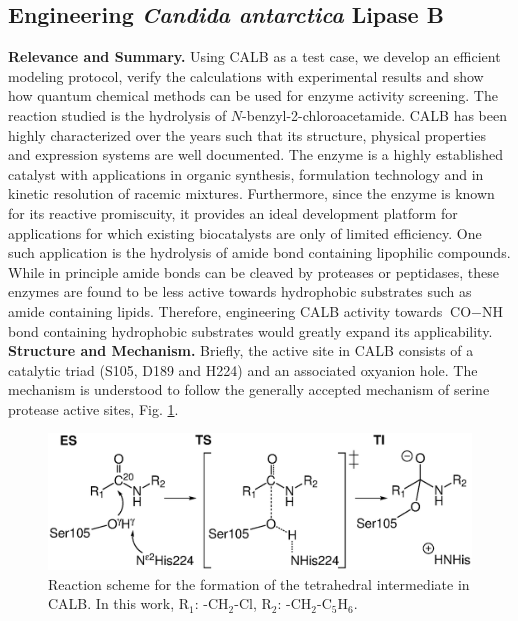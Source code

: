 \subsection{Engineering {\textit{Candida antarctica} Lipase B}}
\textbf{Relevance and Summary.}
Using CALB as a test case, we develop an efficient modeling protocol, verify the calculations with experimental results and show how quantum chemical methods can be used for enzyme activity screening\cite{10.1371/journal.pone.0049849, hediger2013silico}.
The reaction studied is the hydrolysis of $N$-benzyl-2-chloroacetamide.
CALB has been highly characterized over the years such that its structure, physical properties and expression systems are well documented\cite{uppenberg1994sequence, uppenberg1995crystallographic}.
The enzyme is a highly established catalyst with applications in organic synthesis, formulation technology\cite{gayot2003modification} and in kinetic resolution of racemic mixtures\cite{gotor2006candida, naik2010lipases, chaput2012contribution}.
Furthermore, since the enzyme is known for its reactive promiscuity\cite{bornscheuer2004catalytic, CBIC:CBIC200800318}, it provides an ideal development platform for applications for which existing biocatalysts are only of limited efficiency.
One such application is the hydrolysis of amide bond containing lipophilic compounds.
While in principle amide bonds can be cleaved by proteases or peptidases, these enzymes are found to be less active towards hydrophobic substrates such as amide containing lipids\cite{nakagawa2007engineering}.
Therefore, engineering CALB activity towards ${\text{CO}-\text{NH}}$ bond containing hydrophobic substrates would greatly expand its applicability.\\
\textbf{Structure and Mechanism.}
Briefly, the active site in CALB consists of a catalytic triad (S105, D189 and H224) and an associated oxyanion hole.
The mechanism is understood to follow the generally accepted mechanism of serine protease active sites\cite{hedstrom2002serine}, Fig. \ref{fig:calb-mechanism}.
\begin{figure}[htbp] 
\includegraphics[width=0.98\linewidth]{calb-mechanism.eps}
\caption{
Reaction scheme for the formation of the tetrahedral intermediate in CALB.
In this work, R$_1$: -CH$_2$-Cl, R$_2$: -CH$_2$-C$_5$H$_6$\cite{hediger2013silico}.
}
\label{fig:calb-mechanism}
\end{figure}
